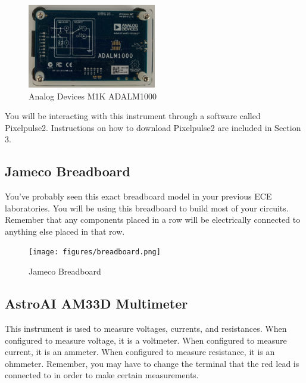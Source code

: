 \documentclass[12pt]{../manual}
\begin{document}
\begin{figure}[ht!]
\begin{center}
\includegraphics[width=0.5\textwidth]{figures/ADALM1000.png}
\caption[Analog Devices M1K ADALM1000]{Analog Devices M1K ADALM1000}
\label{fig:osc}
\end{center}
\end{figure}

You will be interacting with this instrument through a software called Pixelpulse2. Instructions on how to download Pixelpulse2 are included in Section 3.

\subsection{Jameco Breadboard}
You've probably seen this exact breadboard model in your previous ECE laboratories. You will be using this breadboard to build most of your circuits. Remember that any components placed in a row will be electrically connected to anything else placed in that row.

\begin{figure}[ht!]
\begin{center}
\texttt{[image: figures/breadboard.png]}
\caption[Jameco Breadboard]{Jameco Breadboard}
\label{fig:breadboard}
\end{center}
\end{figure}

\subsection{AstroAI AM33D Multimeter}
This instrument is used to measure voltages, currents, and resistances. When configured to measure voltage, it is a voltmeter. When configured to measure current, it is an ammeter. When configured to measure resistance, it is an ohmmeter. Remember, you may have to change the terminal that the red lead is connected to in order to make certain measurements. 
\end{document}
